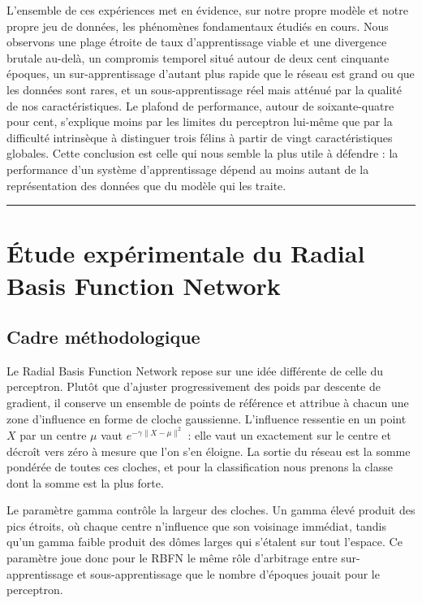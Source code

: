 \documentclass[11pt,a4paper]{report}
\begin{document}
L'ensemble de ces expériences met en évidence, sur notre propre modèle
et notre propre jeu de données, les phénomènes fondamentaux étudiés en
cours. Nous observons une plage étroite de taux d'apprentissage viable
et une divergence brutale au-delà, un compromis temporel situé autour de
deux cent cinquante époques, un sur-apprentissage d'autant plus rapide
que le réseau est grand ou que les données sont rares, et un
sous-apprentissage réel mais atténué par la qualité de nos
caractéristiques. Le plafond de performance, autour de soixante-quatre
pour cent, s'explique moins par les limites du perceptron lui-même que
par la difficulté intrinsèque à distinguer trois félins à partir de
vingt caractéristiques globales. Cette conclusion est celle qui nous
semble la plus utile à défendre : la performance d'un système
d'apprentissage dépend au moins autant de la représentation des données
que du modèle qui les traite.

\begin{center}\rule{0.5\linewidth}{0.5pt}\end{center}

\hypertarget{uxe9tude-expuxe9rimentale-du-radial-basis-function-network}{%
\chapter{Étude expérimentale du Radial Basis Function
Network}\label{uxe9tude-expuxe9rimentale-du-radial-basis-function-network}}

\hypertarget{cadre-muxe9thodologique-2}{%
\section{Cadre méthodologique}\label{cadre-muxe9thodologique-2}}

Le Radial Basis Function Network repose sur une idée différente de celle
du perceptron. Plutôt que d'ajuster progressivement des poids par
descente de gradient, il conserve un ensemble de points de référence et
attribue à chacun une zone d'influence en forme de cloche gaussienne.
L'influence ressentie en un point \(X\) par un centre \(\mu\) vaut
\(e^{-\gamma \|X - \mu\|^2}\) : elle vaut un exactement sur le centre et
décroît vers zéro à mesure que l'on s'en éloigne. La sortie du réseau
est la somme pondérée de toutes ces cloches, et pour la classification
nous prenons la classe dont la somme est la plus forte.

Le paramètre gamma contrôle la largeur des cloches. Un gamma élevé
produit des pics étroits, où chaque centre n'influence que son voisinage
immédiat, tandis qu'un gamma faible produit des dômes larges qui
s'étalent sur tout l'espace. Ce paramètre joue donc pour le RBFN le même
rôle d'arbitrage entre sur-apprentissage et sous-apprentissage que le
nombre d'époques jouait pour le perceptron.
\end{document}

